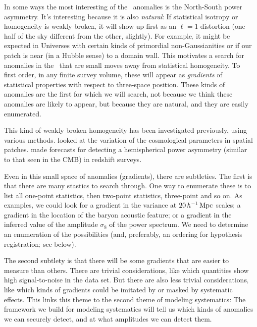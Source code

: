 \documentclass[12pt, fullpage, letterpaper]{article}
\begin{document}
In some ways the most interesting of the \CMB\ anomalies is the
North-South power asymmetry. It's interesting because it is also
\emph{natural}: If statistical isotropy or homogeneity is weakly
broken, it will show up first as an $\ell=1$ distortion (one half of
the sky different from the other, slightly).
For example, it might be expected in Universes with certain kinds
of primordial non-Gaussianities \citep{Dalal2008} or if our patch is
near (in a Hubble sense) to a domain wall.
This motivates a search for anomalies in the \LSS\ that are small
moves away from statistical homogeneity.
To first order, in any finite survey volume, these will appear as
\emph{gradients} of statistical properties with respect to three-space
position.
These kinds of anomalies are the first for which we will search, not
because we think these anomalies are likely to appear, but because they
are natural, and they are easily enumerated.

This kind of weakly broken homogeneity has been investigated previously,
using various methods.
\cite{Mukherjee2018} looked at the variation of the cosmological parameters in spatial patches.
\cite{Zhai2017} made forecasts for detecting a hemispherical power asymmetry (similar to that seen in the CMB) in redshift surveys.

Even in this small space of anomalies (gradients), there are subtleties. The first
is that there are many stastics to search through.
One way to enumerate these is to list all one-point statistics, then two-point statistics, three-point and so on. As examples, we could look for a gradient in the variance at
$20\,h^{-1}\,{\mathrm{Mpc}}$ scales; a gradient in the location
of the baryon acoustic feature; or a gradient in the inferred value of the amplitude
$\sigma_8$ of the power spectrum.
We need to determine an enumeration of the possibilities (and, preferably, an
ordering for hypothesis registration; see below).

The second subtlety is that there will be some gradients that are easier
to measure than others. There are trivial considerations, like which
quantities show high signal-to-noise in the data set. But there are also less
trivial considerations, like which kinds of gradients could be imitated by or
masked by systematic effects.
This links this theme to the second theme of modeling systematics:
The framework we build for modeling systematics will tell us which
kinds of anomalies we can securely detect, and at what amplitudes we
can detect them.
\end{document}
